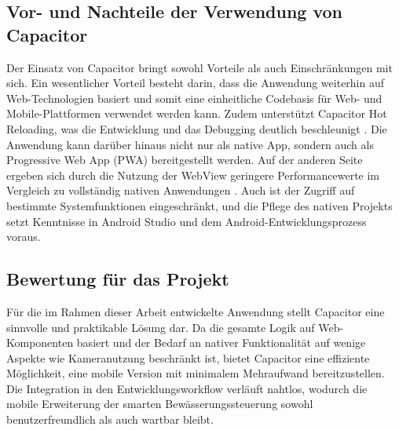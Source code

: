 \subsection{Vor- und Nachteile der Verwendung von Capacitor}
Der Einsatz von Capacitor bringt sowohl Vorteile als auch Einschränkungen mit sich. Ein wesentlicher Vorteil besteht darin, dass die Anwendung weiterhin auf Web-Technologien basiert und somit eine einheitliche Codebasis für Web- und Mobile-Plattformen verwendet werden kann. Zudem unterstützt Capacitor Hot Reloading, was die Entwicklung und das Debugging deutlich beschleunigt \cite{Singh2021}. Die Anwendung kann darüber hinaus nicht nur als native App, sondern auch als Progressive Web App (PWA) bereitgestellt werden. Auf der anderen Seite ergeben sich durch die Nutzung der WebView geringere Performancewerte im Vergleich zu vollständig nativen Anwendungen \cite{Giordano2024}. Auch ist der Zugriff auf bestimmte Systemfunktionen eingeschränkt, und die Pflege des nativen Projekts setzt Kenntnisse in Android Studio und dem Android-Entwicklungsprozess voraus.

\subsection{Bewertung für das Projekt}
Für die im Rahmen dieser Arbeit entwickelte Anwendung stellt Capacitor eine sinnvolle und praktikable Lösung dar. Da die gesamte Logik auf Web-Komponenten basiert und der Bedarf an nativer Funktionalität auf wenige Aspekte wie Kameranutzung beschränkt ist, bietet Capacitor eine effiziente Möglichkeit, eine mobile Version mit minimalem Mehraufwand bereitzustellen. Die Integration in den Entwicklungsworkflow verläuft nahtlos, wodurch die mobile Erweiterung der smarten Bewässerungssteuerung sowohl benutzerfreundlich als auch wartbar bleibt.


